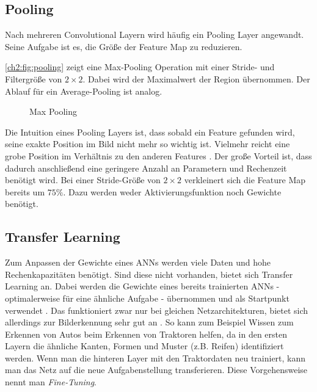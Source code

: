\subsection{Pooling} \label{ch2:cnn:pool}
Nach mehreren Convolutional Layern wird häufig ein Pooling Layer angewandt.
Seine Aufgabe ist es, die Größe der Feature Map zu reduzieren.

\autoref{ch2:fig:pooling} zeigt eine Max-Pooling Operation mit einer Stride- und Filtergröße von $2 \times 2$. Dabei wird der Maximalwert der Region übernommen.
Der Ablauf für ein Average-Pooling ist analog.

\begin{figure}[ht]
    \begin{small}
        \begin{center}
            
        \end{center}
        \caption{Max Pooling \cite{noauthor_martinthoma/latex-examples_nodate}}
        \label{ch2:fig:pooling}
    \end{small}
\end{figure}

Die Intuition eines Pooling Layers ist, dass sobald ein Feature gefunden wird, seine exakte Position im Bild nicht mehr so wichtig ist.
Vielmehr reicht eine grobe Position im Verhältnis zu den anderen Features \cite{nielsen_neural_2018}.
Der große Vorteil ist, dass dadurch anschließend eine geringere Anzahl an Parametern und Rechenzeit benötigt wird.
Bei einer Stride-Größe von $2 \times 2$ verkleinert sich die Feature Map bereits um $75\%$.
Dazu werden weder Aktivierungsfunktion noch Gewichte benötigt.

\subsection{Transfer Learning}
Zum Anpassen der Gewichte eines \ac{ANN}s werden viele Daten und hohe Rechenkapazitäten benötigt.
Sind diese nicht vorhanden, bietet sich Transfer Learning an.
Dabei werden die Gewichte eines bereits trainierten \ac{ANN}s - optimalerweise für eine ähnliche Aufgabe - übernommen und als Startpunkt verwendet \cite{goodfellow_deep_2016}.
Das funktioniert zwar nur bei gleichen Netzarchitekturen, bietet sich allerdings zur Bilderkennung sehr gut an \cite{donahue_decaf:_2013}.
So kann zum Beispiel Wissen zum Erkennen von Autos beim Erkennen von Traktoren helfen, da in den ersten Layern die ähnliche Kanten, Formen und Muster (z.B. Reifen) identifiziert werden.
Wenn man die hinteren Layer mit den Traktordaten neu trainiert, kann man das Netz auf die neue Aufgabenstellung transferieren.
Diese Vorgehensweise nennt man \textit{Fine-Tuning}.

